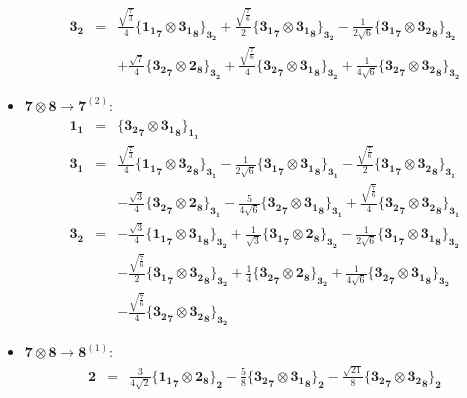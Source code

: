 \documentclass[english]{article}
\newcommand{\subcg}[3]{\big\{ {#1}\otimes{#2}\big\}^{}_{#3}}
\newcommand{\rep}[1]{\mathbf{#1}}
\begin{document}
\begin{itemize}
\begin{eqnarray*}
\\
\rep{3_2} &=& \frac{\sqrt{\frac{7}{3}}}{4}\subcg{\rep{1_1}_{\rep{7}}}{\rep{3_1}_{\rep{8}}}{\rep{3_2}}+\frac{\sqrt{\frac{7}{6}}}{2}\subcg{\rep{3_1}_{\rep{7}}}{\rep{3_1}_{\rep{8}}}{\rep{3_2}}-\frac{1}{2 \sqrt{6}}\subcg{\rep{3_1}_{\rep{7}}}{\rep{3_2}_{\rep{8}}}{\rep{3_2}} \\ 
 & & +\frac{\sqrt{7}}{4}\subcg{\rep{3_2}_{\rep{7}}}{\rep{2}_{\rep{8}}}{\rep{3_2}}+\frac{\sqrt{\frac{7}{6}}}{4}\subcg{\rep{3_2}_{\rep{7}}}{\rep{3_1}_{\rep{8}}}{\rep{3_2}}+\frac{1}{4 \sqrt{6}}\subcg{\rep{3_2}_{\rep{7}}}{\rep{3_2}_{\rep{8}}}{\rep{3_2}}
\end{eqnarray*}
\item $\rep{7}\otimes\rep{8}\to\rep{7}^{(2)}$:
\begin{eqnarray*}
\rep{1_1} &=& \subcg{\rep{3_2}_{\rep{7}}}{\rep{3_1}_{\rep{8}}}{\rep{1_1}}
\\
\rep{3_1} &=& \frac{\sqrt{\frac{7}{3}}}{4}\subcg{\rep{1_1}_{\rep{7}}}{\rep{3_2}_{\rep{8}}}{\rep{3_1}}-\frac{1}{2 \sqrt{6}}\subcg{\rep{3_1}_{\rep{7}}}{\rep{3_1}_{\rep{8}}}{\rep{3_1}}-\frac{\sqrt{\frac{7}{6}}}{2}\subcg{\rep{3_1}_{\rep{7}}}{\rep{3_2}_{\rep{8}}}{\rep{3_1}} \\ 
 & & -\frac{\sqrt{3}}{4}\subcg{\rep{3_2}_{\rep{7}}}{\rep{2}_{\rep{8}}}{\rep{3_1}}-\frac{5}{4 \sqrt{6}}\subcg{\rep{3_2}_{\rep{7}}}{\rep{3_1}_{\rep{8}}}{\rep{3_1}}+\frac{\sqrt{\frac{7}{6}}}{4}\subcg{\rep{3_2}_{\rep{7}}}{\rep{3_2}_{\rep{8}}}{\rep{3_1}}
\\
\rep{3_2} &=& -\frac{\sqrt{3}}{4}\subcg{\rep{1_1}_{\rep{7}}}{\rep{3_1}_{\rep{8}}}{\rep{3_2}}+\frac{1}{\sqrt{3}}\subcg{\rep{3_1}_{\rep{7}}}{\rep{2}_{\rep{8}}}{\rep{3_2}}-\frac{1}{2 \sqrt{6}}\subcg{\rep{3_1}_{\rep{7}}}{\rep{3_1}_{\rep{8}}}{\rep{3_2}} \\ 
 & & -\frac{\sqrt{\frac{7}{6}}}{2}\subcg{\rep{3_1}_{\rep{7}}}{\rep{3_2}_{\rep{8}}}{\rep{3_2}}+\frac{1}{4}\subcg{\rep{3_2}_{\rep{7}}}{\rep{2}_{\rep{8}}}{\rep{3_2}}+\frac{1}{4 \sqrt{6}}\subcg{\rep{3_2}_{\rep{7}}}{\rep{3_1}_{\rep{8}}}{\rep{3_2}} \\ 
 & & -\frac{\sqrt{\frac{7}{6}}}{4}\subcg{\rep{3_2}_{\rep{7}}}{\rep{3_2}_{\rep{8}}}{\rep{3_2}}
\end{eqnarray*}
\item $\rep{7}\otimes\rep{8}\to\rep{8}^{(1)}$:
\begin{eqnarray*}
\rep{2} &=& \frac{3}{4 \sqrt{2}}\subcg{\rep{1_1}_{\rep{7}}}{\rep{2}_{\rep{8}}}{\rep{2}}-\frac{5}{8}\subcg{\rep{3_2}_{\rep{7}}}{\rep{3_1}_{\rep{8}}}{\rep{2}}-\frac{\sqrt{21}}{8}\subcg{\rep{3_2}_{\rep{7}}}{\rep{3_2}_{\rep{8}}}{\rep{2}}

\end{eqnarray*}
\end{itemize}
\end{document}
